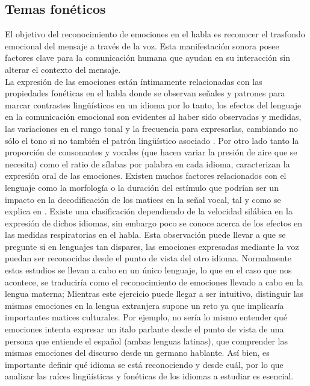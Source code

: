 \documentclass[11pt,a4paper,spanish]{book}
\begin{document}
	\subsection{Temas fonéticos}
	El objetivo del reconocimiento de emociones en el habla es reconocer el trasfondo emocional del mensaje a través de la voz. Esta manifestación sonora posee factores clave para la comunicación humana que ayudan en su interacción sin alterar el contexto del mensaje.\\
	La expresión de las emociones están íntimamente relacionadas con las propiedades fonéticas en el habla donde se observan señales y patrones para marcar contrastes lingüísticos en un idioma \cite{Pell2001} por lo tanto, los efectos del lenguaje en la comunicación emocional son evidentes al haber sido observadas y medidas, las variaciones en el rango tonal y la frecuencia para expresarlas, cambiando no sólo el tono si no también el patrón lingüístico asociado \cite{Davletcharova2015}.
	Por otro lado tanto la proporción de consonantes y vocales (que hacen variar la presión de aire que se necesita) como el ratio de sílabas por palabra en cada idioma, caracterizan la expresión oral de las emociones. Existen muchos factores relacionados con el lenguaje como la morfología o la duración del estímulo que podrían ser un impacto en la decodificación de los matices en la señal vocal, tal y como se explica en \cite{Chen2017}.
	Existe una clasificación dependiendo de la velocidad silábica en la expresión de dichos idiomas, sin embargo poco se conoce acerca de los efectos en las medidas respiratorias en el habla. Esta observación puede llevar a que se pregunte si en lenguajes tan dispares, las emociones expresadas mediante la voz puedan ser reconocidas desde el punto de vista del otro idioma.
	Normalmente estos estudios se llevan a cabo en un único lenguaje, lo que en el caso que nos acontece, se traduciría como el reconocimiento de emociones llevado a cabo en la lengua materna; Mientras este ejercicio puede llegar a ser intuitivo, distinguir las mismas emociones en la lengua extranjera supone un reto ya que implicaría importantes matices culturales. Por ejemplo, no sería lo mismo entender qué emociones intenta expresar un italo parlante desde el punto de vista de una persona que entiende el español (ambas lenguas latinas), que comprender las mismas emociones del discurso desde un germano hablante. Así bien, es importante definir qué idioma se está reconociendo y desde cuál, por lo que analizar las raíces lingüísticas y fonéticas de los idiomas a estudiar es esencial. \hfill \break
	
\end{document}
